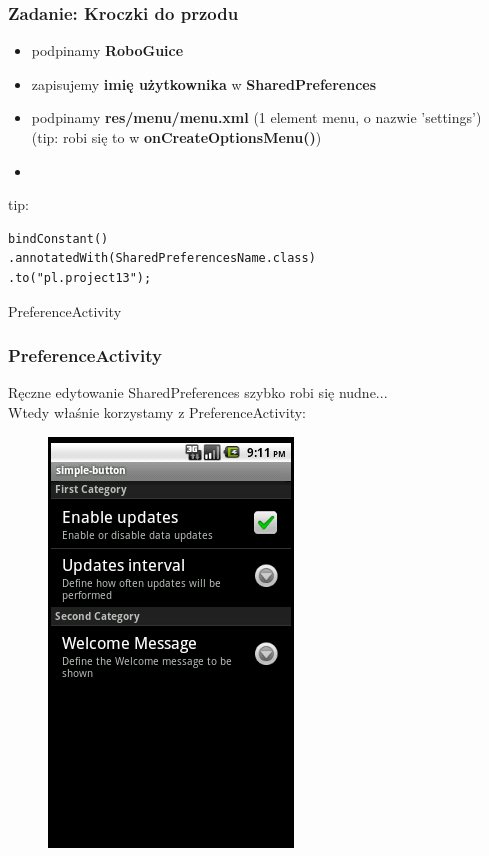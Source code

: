 \begin{frame}[fragile]\frametitle{Zadanie: Kroczki do przodu}
\begin{itemize}
 \item podpinamy \textbf{RoboGuice}
 \item zapisujemy \textbf{imię użytkownika} w \textbf{SharedPreferences}
 \item podpinamy \textbf{res/menu/menu.xml} (1 element menu, o nazwie 'settings') (tip: robi się to w \textbf{onCreateOptionsMenu()})
 \item 
\end{itemize} 

tip:
\begin{verbatim}
bindConstant()
.annotatedWith(SharedPreferencesName.class)
.to("pl.project13");
\end{verbatim}
\end{frame}

\begin{frame}
\begin{center}
 \Huge{PreferenceActivity}
\end{center}
\end{frame}

\begin{frame}\frametitle{PreferenceActivity}
\begin{center}
Ręczne edytowanie SharedPreferences szybko robi się nudne...\\
Wtedy właśnie korzystamy z PreferenceActivity:
 \begin{figure}
 \includegraphics{images/preference_activity}
 \end{figure}
\end{center}
\end{frame}

